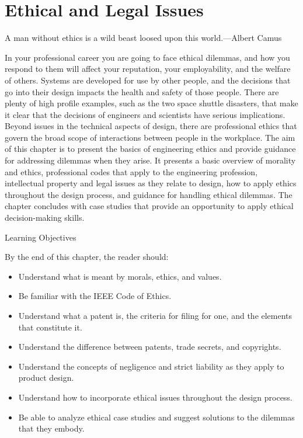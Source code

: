 \section{\texorpdfstring{ Ethical and Legal
Issues}{ Ethical and Legal Issues}}\label{ethical-and-legal-issues}

A man without ethics is a wild beast loosed upon this world.---Albert
Camus

In your professional career you are going to face ethical dilemmas, and
how you respond to them will affect your reputation, your employability,
and the welfare of others. Systems are developed for use by other
people, and the decisions that go into their design impacts the health
and safety of those people. There are plenty of high profile examples,
such as the two space shuttle disasters, that make it clear that the
decisions of engineers and scientists have serious implications. Beyond
issues in the technical aspects of design, there are professional ethics
that govern the broad scope of interactions between people in the
workplace. The aim of this chapter is to present the basics of
engineering ethics and provide guidance for addressing dilemmas when
they arise. It presents a basic overview of morality and ethics,
professional codes that apply to the engineering profession,
intellectual property and legal issues as they relate to design, how to
apply ethics throughout the design process, and guidance for handling
ethical dilemmas. The chapter concludes with case studies that provide
an opportunity to apply ethical decision-making skills.

Learning Objectives

By the end of this chapter, the reader should:

\begin{itemize}
\item
  Understand what is meant by morals, ethics, and values.
\item
  Be familiar with the IEEE Code of Ethics.
\item
  Understand what a patent is, the criteria for filing for one, and the
  elements that constitute it.
\item
  Understand the difference between patents, trade secrets, and
  copyrights.
\item
  Understand the concepts of negligence and strict liability as they
  apply to product design.
\item
  Understand how to incorporate ethical issues throughout the design
  process.
\item
  Be able to analyze ethical case studies and suggest solutions to the
  dilemmas that they embody.
\end{itemize}


